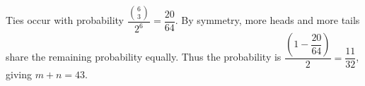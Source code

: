 Ties occur with probability $\dfrac{\binom63}{2^6}=\dfrac{20}{64}$. By symmetry, more heads and more tails share the remaining probability equally. Thus the probability is $\dfrac{(1-\dfrac{20}{64})}{2}=\dfrac{11}{32}$, giving $\boxed{m+n=43}$.
